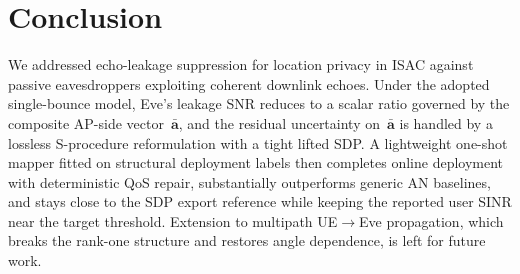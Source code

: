 \documentclass[journal]{IEEEtran}
\begin{document}
\section{Conclusion}
We addressed echo-leakage suppression for location privacy in ISAC against passive eavesdroppers exploiting coherent downlink echoes. Under the adopted single-bounce model, Eve's leakage SNR reduces to a scalar ratio governed by the composite AP-side vector~$\bar{\mathbf{a}}$, and the residual uncertainty on~$\bar{\mathbf{a}}$ is handled by a lossless S-procedure reformulation with a tight lifted SDP. A lightweight one-shot mapper fitted on structural deployment labels then completes online deployment with deterministic QoS repair, substantially outperforms generic AN baselines, and stays close to the SDP export reference while keeping the reported user SINR near the target threshold. Extension to multipath UE$\rightarrow$Eve propagation, which breaks the rank-one structure and restores angle dependence, is left for future work.



\end{document}
